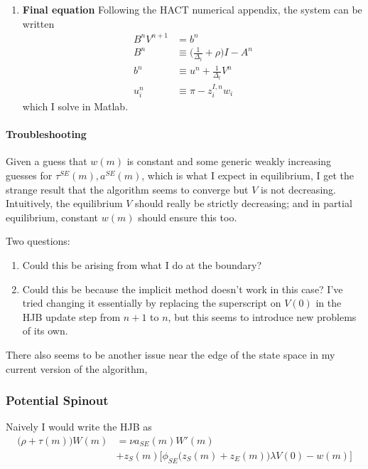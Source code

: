 \documentclass[12pt,english]{article}
\theoremstyle{remark}
\begin{document}
\begin{enumerate}
\begin{enumerate}
		\item \textbf{Final equation} Following the HACT numerical appendix, the system can be written 
		\begin{align*}
			B^n V^{n+1} &= b^n \\
			B^n &\equiv \Big( \frac{1}{\Delta_t} + \rho \Big) I - A^n \\
			b^n &\equiv u^n + \frac{1}{\Delta_t} V^{n} \\
			u^n_i &\equiv \pi - z^{I,n}_i w_i 
		\end{align*}
		which I solve in Matlab.
	\end{enumerate}
\end{enumerate}

\paragraph{Troubleshooting}

Given a guess that $w(m)$ is constant and some generic weakly increasing guesses for $\tau^{SE}(m), a^{SE}(m)$, which is what I expect in equilibrium, I get the strange result that the algorithm seems to converge but $V$ is not decreasing. Intuitively, the equilibrium $V$ should really be strictly decreasing; and in partial equilibrium, constant $w(m)$ should ensure this too. 

Two questions:

\begin{enumerate}
	\item Could this be arising from what I do at the boundary? 
	\item Could this be because the implicit method doesn't work in this case? I've tried changing it essentially by replacing the superscript on $V(0)$ in the HJB update step from $n+1$ to $n$, but this seems to introduce new problems of its own. 
\end{enumerate}

There also seems to be another issue near the edge of the state space in my current version of the algorithm, 


 


\subsubsection{Potential Spinout}

Naively I would write the HJB as
\begin{align*}
	\big(\rho + \tau(m)\big)W(m) &=  \nu a_{SE}(m) W'(m)  \\
&+ z_S(m) \Big[ \phi_{SE}\big(z_S(m) + z_E(m)\big) \lambda V(0) - w(m) \Big] 
\end{align*}
\end{document}
